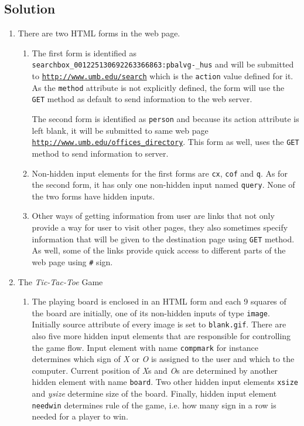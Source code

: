 \subsection*{Solution}

\begin{enumerate}[label=(\alph*)]
\item There are two HTML forms in the web page.
\begin{enumerate}[label=(\roman*)]
\item The first form is identified as \texttt{searchbox\_001225130692263366863:pbalvg-\_hus} and will be submitted to \href{http://www.umb.edu/search}{\texttt{http://www.umb.edu/search}} which is the \texttt{action} value defined for it.
As the \texttt{method} attribute is not explicitly defined, the form will use the \texttt{GET} method as default to send information to the web server.

The second form is identified as \texttt{person} and because its action attribute is left blank, it will be submitted to same web page \href{http://www.umb.edu/offices_directory}{\texttt{http://www.umb.edu/offices\_directory}}.
This form as well, uses the \texttt{GET} method to send information to server.

\item Non-hidden input elements for the first forms are \texttt{cx}, \texttt{cof} and \texttt{q}.
As for the second form, it has only one non-hidden input named \texttt{query}.
None of the two forms have hidden inputs.

\item Other ways of getting information from user are links that not only provide a way for user to visit other pages, they also sometimes specify information that will be given to the destination page using \texttt{GET} method.
As well, some of the links provide quick access to different parts of the web page using \texttt{\#} sign.
\end{enumerate}

\item
The \textit{Tic-Tac-Toe} Game

\begin{enumerate}[label=(\roman*)]
\item
The playing board is enclosed in an HTML form and each 9 squares of the board are initially, one of its non-hidden inputs of type \texttt{image}.
Initially source attribute of every image is set to \texttt{blank.gif}.
There are also five more hidden input elements that are responsible for controlling the game flow.
Input element with name \texttt{compmark} for instance determines which sign of \textit{X} or \textit{O} is assigned to the user and which to the computer.
Current position of \textit{X}s and \textit{O}s are determined by another hidden element with name \texttt{board}.
Two other hidden input elements \texttt{xsize} and \textit{ysize} determine size of the board.
Finally, hidden input element \texttt{needwin} determines rule of the game, i.e. how many sign in a row is needed for a player to win.


\end{enumerate}
\end{enumerate}
